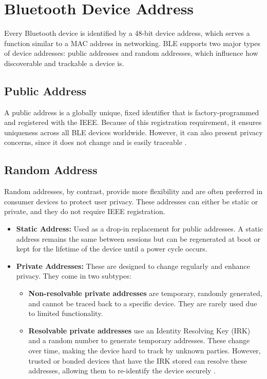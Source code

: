 \section{Bluetooth Device Address}

Every Bluetooth device is identified by a 48-bit device address, which serves a function similar to a MAC address in networking. BLE supports two major types of device addresses: public addresses and random addresses, which influence how discoverable and trackable a device is.

\subsection{Public Address}

A public address is a globally unique, fixed identifier that is factory-programmed and registered with the IEEE. Because of this registration requirement, it ensures uniqueness across all BLE devices worldwide. However, it can also present privacy concerns, since it does not change and is easily traceable \cite{introtoble}.

\subsection{Random Address}

Random addresses, by contrast, provide more flexibility and are often preferred in consumer devices to protect user privacy. These addresses can either be static or private, and they do not require IEEE registration.

\begin{itemize}
    \item \textbf{Static Address:} Used as a drop-in replacement for public addresses. A static address remains the same between sessions but can be regenerated at boot or kept for the lifetime of the device until a power cycle occurs.
    \item \textbf{Private Addresses:} These are designed to change regularly and enhance privacy. They come in two subtypes:
    \begin{itemize}
        \item \textbf{Non-resolvable private addresses} are temporary, randomly generated, and cannot be traced back to a specific device. They are rarely used due to limited functionality.
        \item \textbf{Resolvable private addresses} use an Identity Resolving Key (IRK) and a random number to generate temporary addresses. These change over time, making the device hard to track by unknown parties. However, trusted or bonded devices that have the IRK stored can resolve these addresses, allowing them to re-identify the device securely \cite{introtoble}.
    \end{itemize}
\end{itemize}

